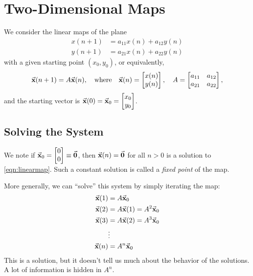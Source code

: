 \newpage
\section{Two-Dimensional Maps}

We consider the linear maps of the plane
\begin{equation}
\begin{split}
  x(n+1) & = a_{11}x(n) + a_{12}y(n) \\
  y(n+1) & = a_{21}x(n) + a_{22}y(n)
\end{split}
\end{equation}
with a given starting point $(x_0,y_0)$,
or equivalently,
\begin{equation}
  \vec{\textbf{x}}(n+1) = A\vec{\textbf{x}}(n), \quad \textrm{where} \quad
     \vec{\textbf{x}}(n) = \begin{bmatrix} x(n) \\ y(n) \end{bmatrix},
     \quad
     A = \begin{bmatrix} a_{11} & a_{12} \\ a_{21} & a_{22} \end{bmatrix},
\label{eqn:linearmap}
\end{equation}
and the starting vector is
$\displaystyle \vec{\textbf{x}}(0) = \vec{\textbf{x}}_0 = \begin{bmatrix} x_0 \\ y_0 \end{bmatrix}$.
%
%
\subsection*{Solving the System}
We note if $\vec{\textbf{x}}_0 = \begin{bmatrix}0 \\ 0\end{bmatrix} \equiv \vec{\textbf{0}}$, then $\vec{\textbf{x}}(n) = \vec{\textbf{0}}$ for all $n>0$ is a solution to \eqref{eqn:linearmap}.
Such a constant solution is called a \emph{fixed point}
of the map.

More generally, we can ``solve'' this system by simply iterating the
map:
\begin{equation}
\begin{split}
  \vec{\textbf{x}}(1) & = A\vec{\textbf{x}}_0 \\
  \vec{\textbf{x}}(2) & = A\vec{\textbf{x}}(1) = A^2\vec{\textbf{x}}_0 \\
  \vec{\textbf{x}}(3) & = A\vec{\textbf{x}}(2) = A^3\vec{\textbf{x}}_0 \\
        & \vdots \\
  \vec{\textbf{x}}(n) & = A^n\vec{\textbf{x}}_0
\end{split}
\end{equation}
This is a solution, but it doesn't tell us much about the
behavior of the solutions.  A lot of information is hidden
in $A^n$.

